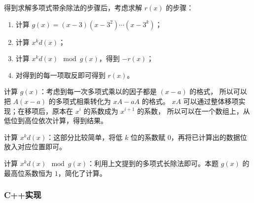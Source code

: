 得到求解多项式带余除法的步骤后，考虑求解 $r(x)$ 的步骤：

\begin{enumerate}
  \item 计算 $g(x)=(x-3)(x-3^2)\cdots(x-3^k)$；
  \item 计算 $x^kd(x)$；
  \item 计算 $x^kd(x) \mod g(x)$，得到 $-r(x)$；
  \item 对得到的每一项取反即可得到 $r(x)$。
\end{enumerate}

计算 $g(x)$：考虑到每一次多项式乘以的因子都是 $(x-a)$ 的格式，
所以可以把 $A(x-a)$ 的多项式相乘转化为 $xA-aA$ 的格式。
$xA$ 可以通过整体移项实现；在移项后，原本在 $x^i$ 的系数成为 $x^{i+1}$ 的系数，
所以可以在一个数组上，从低位到高位依次计算，得到结果。

计算 $x^kd(x)$：这部分比较简单，将低 $k$ 位的系数赋 $0$，再将已计算出的数据位放入对应位置即可。

计算 $x^kd(x) \mod g(x)$：利用上文提到的多项式长除法即可。本题 $g(x)$ 的最高位系数恒为 $1$，简化了计算。

\subsubsection{C++实现}

